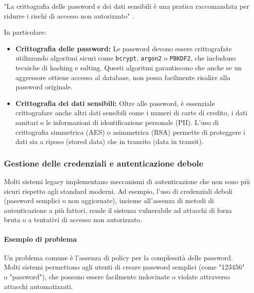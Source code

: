 "La crittografia delle password e dei dati sensibili è una pratica raccomandata per ridurre i rischi di accesso non autorizzato" \cite{Sch15}.

In particolare:
\begin{itemize}
    \item \textbf{Crittografia delle password:} Le password devono essere crittografate utilizzando algoritmi sicuri come \texttt{bcrypt}, \texttt{argon2} o \texttt{PBKDF2}, che includono tecniche di hashing e salting. Questi algoritmi garantiscono che anche se un aggressore ottiene accesso al database, non possa facilmente risalire alla password originale.
    \item \textbf{Crittografia dei dati sensibili:} Oltre alle password, è essenziale crittografare anche altri dati sensibili come i numeri di carte di credito, i dati sanitari o le informazioni di identificazione personale (PII). L'uso di crittografia simmetrica (AES) o asimmetrica (RSA) permette di proteggere i dati sia a riposo (stored data) che in transito (data in transit).
\end{itemize}

\subsubsection{Gestione delle credenziali e autenticazione debole}
Molti sistemi legacy implementano meccanismi di autenticazione che non sono più sicuri rispetto agli standard moderni. Ad esempio, l'uso di credenziali deboli (password semplici o non aggiornate), insieme all'assenza di metodi di autenticazione a più fattori, rende il sistema vulnerabile ad attacchi di forza bruta o a tentativi di accesso non autorizzato.

\paragraph{Esempio di problema}
Un problema comune è l'assenza di policy per la complessità delle password. Molti sistemi permettono agli utenti di creare password semplici (come "123456" o "password"), che possono essere facilmente indovinate o violate attraverso attacchi automatizzati.

